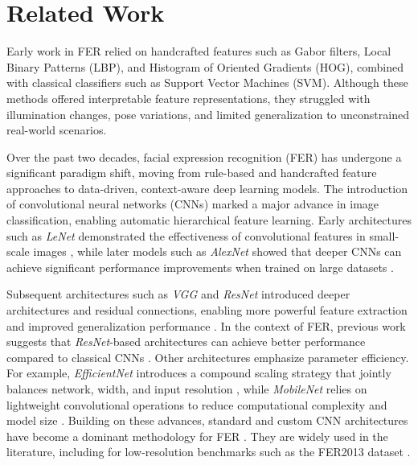 \section{Related Work}
\label{sec:formatting}

Early work in FER relied on handcrafted features such as Gabor filters, Local Binary Patterns (LBP), and Histogram of Oriented Gradients (HOG), combined with classical classifiers such as Support Vector Machines (SVM). Although these methods offered interpretable feature representations, they struggled with illumination changes, pose variations, and limited generalization to unconstrained real-world scenarios. \cite{Jayaswal, REVINA2021619}

Over the past two decades, facial expression recognition (FER) has undergone a significant paradigm shift, moving from rule-based and handcrafted feature approaches to data-driven, context-aware deep learning models. The introduction of convolutional neural networks (CNNs) marked a major advance in image classification, enabling automatic hierarchical feature learning. Early architectures such as \textit{LeNet} demonstrated the effectiveness of convolutional features in small-scale images \cite{GradientLeNet}, while later models such as \textit{AlexNet} showed that deeper CNNs can achieve significant performance improvements when trained on large datasets \cite{AlexNet}.

Subsequent architectures such as \textit{VGG} and \textit{ResNet} introduced deeper architectures and residual connections, enabling more powerful feature extraction and improved generalization performance \cite{deepconv, deepres}. In the context of FER, previous work suggests that \textit{ResNet}-based architectures can achieve better performance compared to classical CNNs \cite{gao2024cnnresnet}. Other architectures emphasize parameter efficiency. For example, \textit{EfficientNet} introduces a compound scaling strategy that jointly balances network, width, and input resolution \cite{tan2020efficientnet}, while \textit{MobileNet} relies on lightweight convolutional operations to reduce computational complexity and model size \cite{howard2017mobilenet}. Building on these advances, standard and custom CNN architectures have become a dominant methodology for FER \cite{pereira}. They are widely used in the literature, including for low-resolution benchmarks such as the FER2013 dataset \cite{Mollahosseini_2016,khaireddin2021facialemotionrecognitionstate}.

